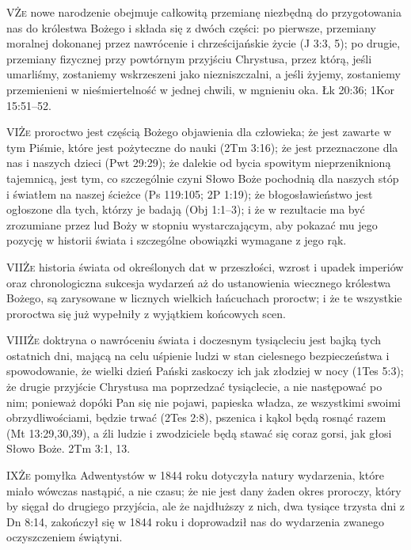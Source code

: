 \lettrine{V}{Że} nowe narodzenie obejmuje całkowitą przemianę niezbędną do przygotowania nas do królestwa Bożego i składa się z dwóch części: po pierwsze, przemiany moralnej dokonanej przez nawrócenie i chrześcijańskie życie (J 3:3, 5); po drugie, przemiany fizycznej przy powtórnym przyjściu Chrystusa, przez którą, jeśli umarliśmy, zostaniemy wskrzeszeni jako niezniszczalni, a jeśli żyjemy, zostaniemy przemienieni w nieśmiertelność w jednej chwili, w mgnieniu oka. Łk 20:36; 1Kor 15:51--52.

\lettrine{VI}{Że} proroctwo jest częścią Bożego objawienia dla człowieka; że jest zawarte w tym Piśmie, które jest pożyteczne do nauki (2Tm 3:16); że jest przeznaczone dla nas i naszych dzieci (Pwt 29:29); że dalekie od bycia spowitym nieprzeniknioną tajemnicą, jest tym, co szczególnie czyni Słowo Boże pochodnią dla naszych stóp i światłem na naszej ścieżce (Ps 119:105; 2P 1:19); że błogosławieństwo jest ogłoszone dla tych, którzy je badają (Obj 1:1--3); i że w rezultacie ma być zrozumiane przez lud Boży w stopniu wystarczającym, aby pokazać mu jego pozycję w historii świata i szczególne obowiązki wymagane z jego rąk.

\lettrine{VII}{Że} historia świata od określonych dat w przeszłości, wzrost i upadek imperiów oraz chronologiczna sukcesja wydarzeń aż do ustanowienia wiecznego królestwa Bożego, są zarysowane w licznych wielkich łańcuchach proroctw; i że te wszystkie proroctwa się już wypełniły z wyjątkiem końcowych scen.

\lettrine{VIII}{Że} doktryna o nawróceniu świata i doczesnym tysiącleciu jest bajką tych ostatnich dni, mającą na celu uśpienie ludzi w stan cielesnego bezpieczeństwa i spowodowanie, że wielki dzień Pański zaskoczy ich jak złodziej w nocy (1Tes 5:3); że drugie przyjście Chrystusa ma poprzedzać tysiąclecie, a nie następować po nim; ponieważ dopóki Pan się nie pojawi, papieska władza, ze wszystkimi swoimi obrzydliwościami, będzie trwać (2Tes 2:8), pszenica i kąkol będą rosnąć razem (Mt 13:29,30,39), a źli ludzie i zwodziciele będą stawać się coraz gorsi, jak głosi Słowo Boże. 2Tm 3:1, 13.

\lettrine{IX}{Że} pomyłka Adwentystów w 1844 roku dotyczyła natury wydarzenia, które miało wówczas nastąpić, a nie czasu; że nie jest dany żaden okres proroczy, który by sięgał do drugiego przyjścia, ale że najdłuższy z nich, dwa tysiące trzysta dni z Dn 8:14, zakończył się w 1844 roku i doprowadził nas do wydarzenia zwanego oczyszczeniem świątyni.

